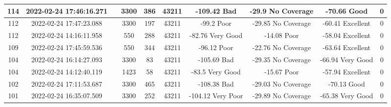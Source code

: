 \begin{longtable*}{|c|c|c|c|c|c|c|c|c|c|}
114&2022-02-24 17:46:16.271&&3300&386&43211& -109.42   Bad         & -29.9     No Coverage & -70.66    Good        & 0\\\hline
{}112&2022-02-24 17:47:23.088&&3300&197&43211& -99.2     Poor        & -29.85    No Coverage & -60.41    Excellent   & 0\\\hline
{}112&2022-02-24 14:16:11.958&&550&288&43211& -82.76    Very Good   & -14.08    Poor        & -58.04    Excellent   & 0\\\hline
{}109&2022-02-24 17:45:59.536&&550&344&43211& -96.12    Poor        & -22.76    No Coverage & -63.64    Excellent   & 0\\\hline
{}104&2022-02-24 16:14:27.093&&3300&83&43211& -105.69   Bad         & -29.35    No Coverage & -66.94    Very Good   & 0\\\hline
{}104&2022-02-24 14:12:40.119&&1423&58&43211& -83.5     Very Good   & -15.67    Poor        & -57.94    Excellent   & 0\\\hline
{}102&2022-02-24 17:11:53.687&&3300&465&43211& -108.38   Bad         & -29.03    No Coverage & -70.13    Good        & 0\\\hline
{}101&2022-02-24 16:35:07.509&&3300&252&43211& -104.12   Very Poor   & -29.89    No Coverage & -65.38    Very Good   & 0\\\hline

\end{longtable*}
